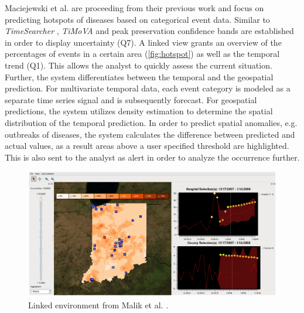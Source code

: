\documentclass[electronic]{vgtc}             %
\begin{document}
Maciejewski et al. \cite{maciejewski:2011} are proceeding from their previous work \cite{maciejewski:2008, maciejewski:2007} and focus on predicting hotspots of diseases based on categorical event data.
Similar to \textit{TimeSearcher} \cite{buono:2007}, \textit{TiMoVA} \cite{boegl:2013} and peak preservation \cite{Hao:2012} confidence bands are established in order to display uncertainty (Q7).
A linked view grants an overview of the percentages of events in a certain area (\autoref{fig:hotspot}) as well as the temporal trend (Q1).
This allows the analyst to quickly assess the current situation.
Further, the system differentiates between the temporal and the geospatial prediction.
For multivariate temporal data, each event category is modeled as a separate time series signal and is subsequently forecast. 
For geospatial predictions, the system utilizes density estimation to determine the spatial distribution of the temporal prediction. 
In order to predict spatial anomalies, e.g. outbreaks of diseases, the system calculates the difference between predicted and actual values, as a result areas above a user specified threshold are highlighted.
This is also sent to the analyst as alert in order to analyze the occurrence further.

\begin{figure}[b]
	\centering
	\includegraphics[width=\columnwidth]{Hotspot}
	\caption{Linked environment from Malik et al. \cite{maciejewski:2011}. 
	}
	\label{fig:hotspot}
\end{figure}
\end{document}
